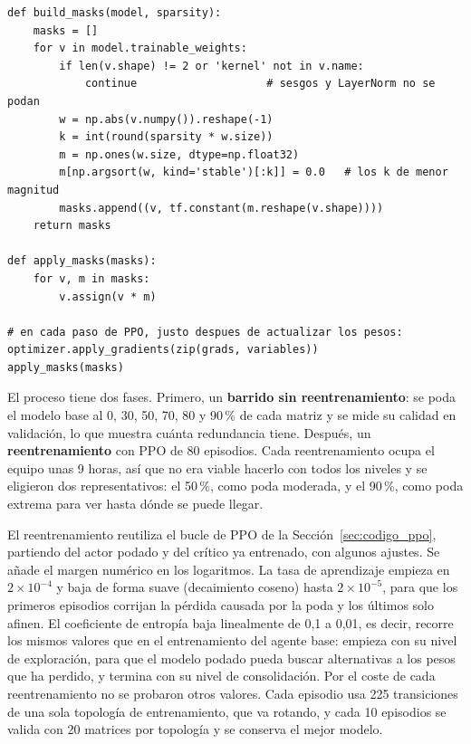 \begin{lstlisting}[style=Python, caption={[Máscaras de poda]Construcción y aplicación de las máscaras de poda (\texttt{fine\_tune\_pruned\_v2.py}).}, label=lst:poda]
def build_masks(model, sparsity):
    masks = []
    for v in model.trainable_weights:
        if len(v.shape) != 2 or 'kernel' not in v.name:
            continue                    # sesgos y LayerNorm no se podan
        w = np.abs(v.numpy()).reshape(-1)
        k = int(round(sparsity * w.size))
        m = np.ones(w.size, dtype=np.float32)
        m[np.argsort(w, kind='stable')[:k]] = 0.0   # los k de menor magnitud
        masks.append((v, tf.constant(m.reshape(v.shape))))
    return masks

def apply_masks(masks):
    for v, m in masks:
        v.assign(v * m)

# en cada paso de PPO, justo despues de actualizar los pesos:
optimizer.apply_gradients(zip(grads, variables))
apply_masks(masks)
\end{lstlisting}

El proceso tiene dos fases. Primero, un \textbf{barrido sin reentrenamiento}: se poda el modelo base al 0, 30, 50, 70, 80 y 90\,\% de cada matriz y se mide su calidad en validación, lo que muestra cuánta redundancia tiene. Después, un \textbf{reentrenamiento} con PPO de 80 episodios. Cada reentrenamiento ocupa el equipo unas 9 horas, así que no era viable hacerlo con todos los niveles y se eligieron dos representativos: el 50\,\%, como poda moderada, y el 90\,\%, como poda extrema para ver hasta dónde se puede llegar.

El reentrenamiento reutiliza el bucle de PPO de la Sección~\ref{sec:codigo_ppo}, partiendo del actor podado y del crítico ya entrenado, con algunos ajustes. Se añade el margen numérico en los logaritmos. La tasa de aprendizaje empieza en $2\times10^{-4}$ y baja de forma suave (decaimiento coseno) hasta $2\times10^{-5}$, para que los primeros episodios corrijan la pérdida causada por la poda y los últimos solo afinen. El coeficiente de entropía baja linealmente de 0,1 a 0,01, es decir, recorre los mismos valores que en el entrenamiento del agente base: empieza con su nivel de exploración, para que el modelo podado pueda buscar alternativas a los pesos que ha perdido, y termina con su nivel de consolidación. Por el coste de cada reentrenamiento no se probaron otros valores. Cada episodio usa 225 transiciones de una sola topología de entrenamiento, que va rotando, y cada 10 episodios se valida con 20 matrices por topología y se conserva el mejor modelo.

